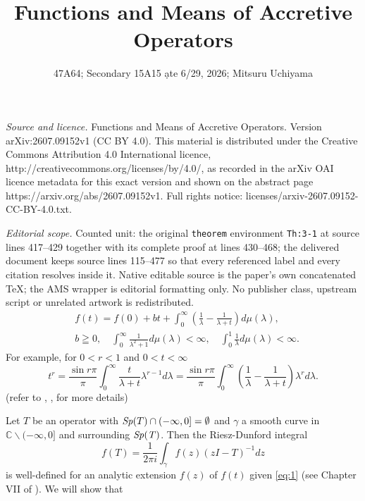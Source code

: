 \documentclass[10pt,a4paper]{amsart}
\begin{document}
\title[Functions and Means of Accretive Operators]{Functions and Means of Accretive Operators}
\author{47A64; Secondary 15A15 ạte 6/29, 2026; Mitsuru Uchiyama}
\date{}
\maketitle
\noindent\emph{Source and licence.} Functions and Means of Accretive Operators. Version arXiv:2607.09152v1 (CC BY 4.0). This material is distributed under the Creative Commons Attribution 4.0 International licence, http://creativecommons.org/licenses/by/4.0/, as recorded in the arXiv OAI licence metadata for this exact version and shown on the abstract page https://arxiv.org/abs/2607.09152v1. Full rights notice: licenses/arxiv-2607.09152-CC-BY-4.0.txt.\par\smallskip
\noindent\textit{Editorial scope.} Counted unit: the original \texttt{theorem} environment \texttt{Th:3-1} at source lines 417--429 together with its complete proof at lines 430--468; the delivered document keeps source lines 115--477 so that every referenced label and every citation resolves inside it. Native editable source is the paper's own concatenated TeX; the AMS wrapper is editorial formatting only. No publisher class, upstream script or unrelated artwork is redistributed.
\begin{equation}
\begin{split}
&f(t)= f(0) + bt + \int_0^{\infty} (\frac{1}{\lambda} - \frac{1}{\lambda +t}) d\mu(\lambda), \\ 
&b\geqq 0, \quad \int_0^{\infty}\frac{1}{\lambda^2 + 1} d\mu (\lambda) <\infty, \quad \int_0^1 
\frac{1}{\lambda} d\mu(\lambda)<\infty. \label{eq:1}
\end{split}
\end{equation}
For example,  for $0<r<1$ and $0<t<\infty$
$$t^r = \frac{\sin r \pi}{\pi} \int_0^{\infty} \frac{t}{\lambda + t } \lambda ^{r-1} d\lambda =
 \frac{\sin r \pi}{\pi} \int_0^{\infty} 
 (\frac{1}{\lambda} - \frac{1}{\lambda +t}) \lambda ^{r} d\lambda.$$
(refer to \cite{D}, \cite{B-M}, \cite{Simon} for more details)\par
Let $T$ be an operator with ${\it Sp}(T) \cap (-\infty, 0] = \emptyset$ and 
 $\gamma$ a smooth curve 
in $\mathbb{C} \smallsetminus (-\infty, 0]$ and surrounding 
$\it{Sp}(T)$. Then 
the Riesz-Dunford integral
$$f(T) = \frac{1}{2\pi i}\int_{\gamma}  f(z) (z I - T)^{-1} dz$$
 is well-defined for an analytic extension $f(z)$ of $f(t)$ given \eqref{eq:1}
(see Chapter VII of \cite{D-S}).
We will show that
\end{document}

